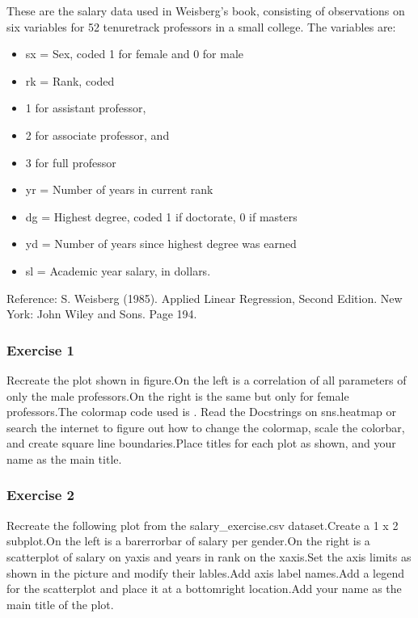 \documentclass[letterpaper,10pt,english]{sphinxmanual}
\begin{document}
These are the salary data used in Weisberg’s book, consisting of observations on six variables for 52 tenure\sphinxhyphen{}track professors in a small college. The variables are:
\begin{itemize}
\item {} 
sx = Sex, coded 1 for female and 0 for male

\item {} 
rk = Rank, coded

\item {} 
1 for assistant professor,

\item {} 
2 for associate professor, and

\item {} 
3 for full professor

\item {} 
yr = Number of years in current rank

\item {} 
dg = Highest degree, coded 1 if doctorate, 0 if masters

\item {} 
yd = Number of years since highest degree was earned

\item {} 
sl = Academic year salary, in dollars.

\end{itemize}

Reference: S. Weisberg (1985). Applied Linear Regression, Second Edition. New York: John Wiley and Sons. Page 194.


\subsubsection{Exercise 1}
\label{\detokenize{content/Introduction_to_Plotting:exercise-1}}
Recreate the plot shown in figure.On the left is a correlation of all parameters of only the male professors.On the right is the same but only for female professors.The colormap code used is . Read the Docstrings on sns.heatmap or search the internet to figure out how to change the colormap, scale the colorbar, and create square line boundaries.Place titles for each plot as shown, and your name as the main title.



\subsubsection{Exercise 2}
\label{\detokenize{content/Introduction_to_Plotting:exercise-2}}
Recreate the following plot from the salary\_exercise.csv dataset.Create a 1 x 2 subplot.On the left is a bar\sphinxhyphen{}errorbar of salary per gender.On the right is a scatterplot of salary on y\sphinxhyphen{}axis and years in rank on the x\sphinxhyphen{}axis.Set the axis limits as shown in the picture and modify their lables.Add axis label names.Add a legend for the scatterplot and place it at a bottom\sphinxhyphen{}right location.Add your name as the main title of the plot.
\end{document}
